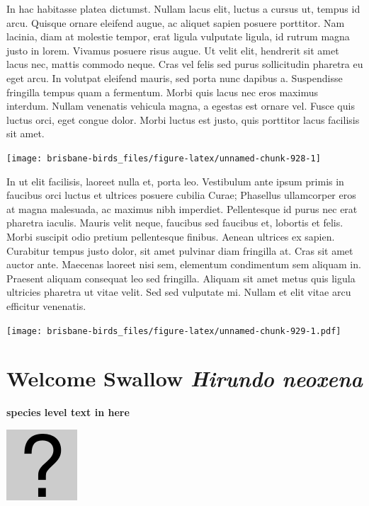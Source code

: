 \documentclass[]{book}
\let\origfigure\figure
\let\endorigfigure\endfigure
\renewenvironment{figure}[1][2] {
  \expandafter\origfigure\expandafter[H]
} {
  \endorigfigure
}
\begin{document}
In hac habitasse platea dictumst. Nullam lacus elit, luctus a cursus ut,
tempus id arcu. Quisque ornare eleifend augue, ac aliquet sapien posuere
porttitor. Nam lacinia, diam at molestie tempor, erat ligula vulputate
ligula, id rutrum magna justo in lorem. Vivamus posuere risus augue. Ut
velit elit, hendrerit sit amet lacus nec, mattis commodo neque. Cras vel
felis sed purus sollicitudin pharetra eu eget arcu. In volutpat eleifend
mauris, sed porta nunc dapibus a. Suspendisse fringilla tempus quam a
fermentum. Morbi quis lacus nec eros maximus interdum. Nullam venenatis
vehicula magna, a egestas est ornare vel. Fusce quis luctus orci, eget
congue dolor. Morbi luctus est justo, quis porttitor lacus facilisis sit
amet.

\begin{figure}
\texttt{[image: brisbane-birds\_files/figure-latex/unnamed-chunk-928-1]} \caption{insert figure caption}\label{fig:unnamed-chunk-928}
\end{figure}

In ut elit facilisis, laoreet nulla et, porta leo. Vestibulum ante ipsum
primis in faucibus orci luctus et ultrices posuere cubilia Curae;
Phasellus ullamcorper eros at magna malesuada, ac maximus nibh
imperdiet. Pellentesque id purus nec erat pharetra iaculis. Mauris velit
neque, faucibus sed faucibus et, lobortis et felis. Morbi suscipit odio
pretium pellentesque finibus. Aenean ultrices ex sapien. Curabitur
tempus justo dolor, sit amet pulvinar diam fringilla at. Cras sit amet
auctor ante. Maecenas laoreet nisi sem, elementum condimentum sem
aliquam in. Praesent aliquam consequat leo sed fringilla. Aliquam sit
amet metus quis ligula ultricies pharetra ut vitae velit. Sed sed
vulputate mi. Nullam et elit vitae arcu efficitur venenatis.

\begin{figure}
\centering
\texttt{[image: brisbane-birds\_files/figure-latex/unnamed-chunk-929-1.pdf]}
\caption{\label{fig:unnamed-chunk-929}insert figure caption}
\end{figure}

\section{\texorpdfstring{Welcome Swallow \emph{Hirundo
neoxena}}{Welcome Swallow Hirundo neoxena}}\label{welcome-swallow-hirundo-neoxena}

\textbf{species level text in here}

\begin{figure}
\centering
\includegraphics{assets/missing.png}
\caption{No image for species}
\end{figure}
\end{document}
